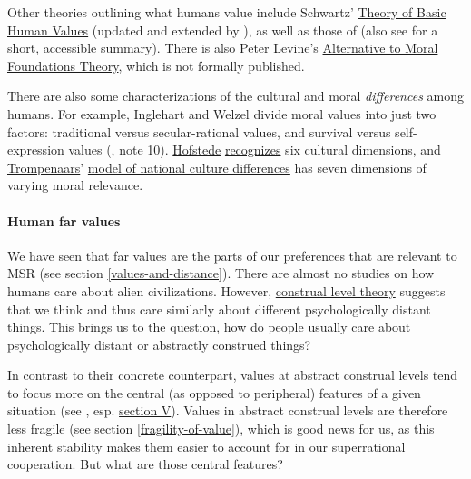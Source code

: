 Other theories outlining what humans value include Schwartz'
\href{https://en.wikipedia.org/wiki/Theory_of_Basic_Human_Values}{Theory
of Basic Human Values} (updated and extended by
\citet{Schwartz2012-qi}), as well as those of
\citet{Shweder1997-ge} (also see
\citet[chapter 9.4]{Pinker2011-el} for a short, accessible summary).
There is also Peter Levine's
\href{http://peterlevine.ws/?p=16998}{Alternative to Moral
Foundations Theory}, which is not formally published.

There are also some characterizations of the cultural and moral
\emph{differences} among humans. For example,
Inglehart and Welzel divide moral values into just
two factors: traditional versus secular-rational values, and survival
versus self-expression values (\cite*{Inglehart2010-qr}, note 10).
\href{https://en.wikipedia.org/wiki/Geert_Hofstede}{Hofstede}
\href{https://en.wikipedia.org/wiki/Hofstede\%27s_cultural_dimensions_theory}{recognizes}
six cultural dimensions, and
\href{https://en.wikipedia.org/wiki/Fons_Trompenaars}{Trompenaars}'
\href{https://en.wikipedia.org/wiki/Trompenaars\%27_model_of_national_culture_differences}{model
of national culture differences} has seven dimensions of varying moral
relevance.

\hypertarget{human-far-values}{\paragraph{Human far
values}\label{human-far-values}}

We have seen that far values are the parts of our preferences that are
relevant to MSR (see section
\ref{values-and-distance}). There are almost no studies on how humans care about
alien civilizations. However,
\href{https://en.wikipedia.org/wiki/Construal_level_theory}{construal
level theory} suggests that we think and thus care similarly about
different psychologically distant things. This brings us to the
question, how do people usually care about psychologically distant or
abstractly construed things?

In contrast to their concrete counterpart, values at abstract construal
levels tend to focus more on the central (as opposed to peripheral)
features of a given situation (see \citet{Trope2010-vo},
esp.
\href{http://www.psych.nyu.edu/trope/Trope_Liberman_2010.pdf\#page=12}{section
V}). Values in abstract construal levels are therefore less fragile
(see section \ref{fragility-of-value}), which is good news for us, as this inherent stability makes
them easier to account for in our superrational cooperation. But what
are those central features?

